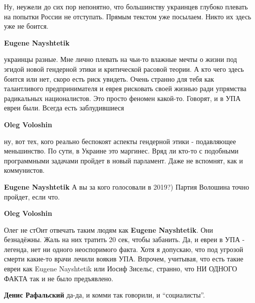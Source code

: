  
 
 
 
 
\zzSecCmt

\begin{itemize} %

Ну, неужели до сих пор непонятно, что большинству украинцев глубоко плевать на
попытки России не отступать. Прямым текстом уже посылаем. Никто их здесь уже не
боится.

\begin{itemize} %
\textbf{Eugene Nayshtetik} 

украинцы разные. Мне лично плевать на чьи-то влажные мечты о жизни под эгидой
новой гендерной этики и критической расовой теории. А кто чего здесь боится или
нет, скоро есть риск увидеть. Очень странно для тебя как талантливого
предпринимателя и еврея рисковать своей жизнью ради упрямства радикальных
националистов. Это просто феномен какой-то. Говорят, и в УПА евреи были. Всегда
есть заблудившиеся

\textbf{Oleg Voloshin} 

ну, вот тех, кого реально беспокоят аспекты гендерной этики - подавляющее
меньшинство. По сути, в Украине это маргинес. Вряд ли кто-то с подобными
программными задачами пройдет в новый парламент. Даже не вспомнят, как и
коммунистов.

\textbf{Eugene Nayshtetik} А вы за кого голосовали в 2019?) Партия Волошина точно пройдет, если что.

\textbf{Oleg Voloshin} 

Олег не стОит отвечать таким людям как \textbf{Eugene Nayshtetik}. Они безнадёжны. Жаль
на них тратить 20 сек, чтобы забанить. Да, и евреи в УПА - легенда, нет ни
одного неоспоримого факта. Хотя я допускаю, что под угрозой смерти какие-то
врачи лечили воякив УПА. Впрочем, учитывая, что есть такие евреи как Eugene
Nayshtetik или Иосиф Зисельс, странно, что НИ ОДНОГО ФАКТА так и не было
предъявлено.


\textbf{Денис Рафальский} да-да, и комми так говорили, и \enquote{социалисты}.


\end{itemize}
\end{itemize}
